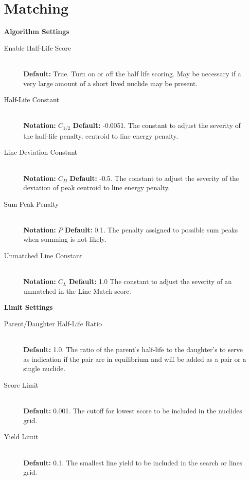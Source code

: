 \documentclass[12pt,report,justified]{SANDreport}
\begin{document}
\section{Matching}\label{sec:set_match}
\begin{center}
{\large \textbf{Algorithm Settings}}
\end{center}
\begin{description}
\item[Enable Half-Life Score]\label{itm:hl_score} \hfill \\
\textbf{Default:} True. Turn on or off the half life scoring. May be necessary if a very large amount
of a short lived nuclide may be present.
\item[Half-Life Constant]\label{itm:hl_const} \hfill \\
\textbf{Notation:} \( C_{1/2}\) \textbf{Default:} -0.0051. The constant to adjust the severity of the half-life penalty.
centroid to line energy penalty.
\item[Line Deviation Constant]\label{itm:ln_dev_const} \hfill \\
\textbf{Notation:} \( C_D\) \textbf{Default:} -0.5. The constant to adjust the severity of the deviation of peak
centroid to line energy penalty.
\item[Sum Peak Penalty]\label{itm:sm_peak_pen} \hfill \\
\textbf{Notation:} \( P\) \textbf{Default:} 0.1. The penalty assigned to possible sum peaks when summing is
not likely.
\item[Unmatched Line Constant]\label{itm:um_line_const} \hfill \\
\textbf{Notation:} \( C_L\) \textbf{Default:} 1.0 The constant to adjust the severity of an unmatched in the Line Match score.
\end{description}

\begin{center}
{\large \textbf{Limit Settings}}
\end{center}
\begin{description}
\item[Parent/Daughter Half-Life Ratio]\label{itm:pd_hl_ratio} \hfill \\
\textbf{Default:} 1.0. The ratio of the parent’s half-life to the daughter’s to serve as indication if the
pair are in equilibrium and will be added as a pair or a single nuclide.
\item[Score Limit]\label{itm:score_lim} \hfill \\
\textbf{Default:} 0.001. The cutoff for lowest score to be included in the nuclides grid.
\item[Yield Limit]\label{itm:yld_lim} \hfill \\
 \textbf{Default:} 0.1. The smallest line yield to be included in the search or lines grid.
\end{description}
\end{document}
